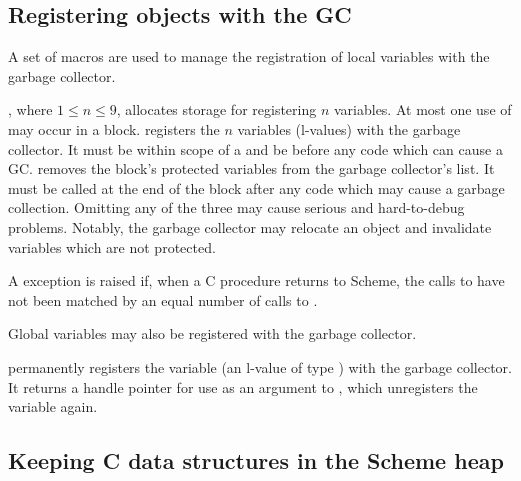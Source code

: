 \subsection{Registering objects with the GC}
\label{sec:gc-register}

A set of macros are used to manage the registration of local variables with the
 garbage collector.

\begin{protos}
\end{protos}

, where  $1\leq n\leq 9$, allocates
 storage for registering $n$ variables.
At most one use of  may occur in a
 block.
 registers the
 $n$ variables (l-values) with the garbage collector.
It must be within scope of a 
 and be before any code which can cause a GC.
 removes the block's protected variables from
 the garbage collector's list.
It must be called at the end of the block after 
  any code which may cause a garbage collection.
Omitting any of the three may cause serious and
 hard-to-debug problems.
Notably, the garbage collector may relocate an object and
 invalidate  variables which are not protected.

A  exception is raised if, when a C
 procedure returns to Scheme, the calls
 to  have not been matched by an equal number of
 calls to .

Global variables may also be registered with the garbage collector.

\begin{protos}
\end{protos}

\noindent{} permanently registers the
variable  (an l-value of type ) with the
garbage collector.  It returns a handle pointer for use as an argument
to , which unregisters the variable
again.

\subsection{Keeping C data structures in the Scheme heap}
\label{sec:external-data}

